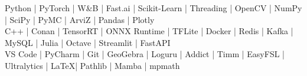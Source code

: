 Python | PyTorch | W\&B | Fast.ai | Scikit-Learn | Threading | OpenCV | NumPy | SciPy | PyMC | ArviZ | Pandas | Plotly \\
C++ | Conan | TensorRT | ONNX Runtime | TFLite | Docker | Redis | Kafka | MySQL | Julia | Octave | Streamlit | FastAPI \\
VS Code | PyCharm | Git | GeoGebra | Loguru | Addict | Timm | EasyFSL | Ultralytics | \LaTeX | Pathlib | Mamba | mpmath

     
     
     
     
